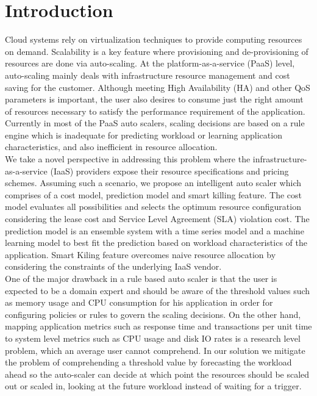 \section{Introduction}
Cloud systems rely on virtualization techniques to provide computing resources on demand. Scalability is a key feature where provisioning and de-provisioning of resources are done via auto-scaling. At the platform-as-a-service (PaaS) level, auto-scaling mainly deals with infrastructure resource management and cost saving for the customer. Although meeting High Availability (HA) and other QoS parameters is important, the user also desires to consume just the right amount of resources necessary to satisfy the performance requirement of the application. Currently in most of the PaaS auto scalers, scaling decisions are based on a rule engine which is inadequate for predicting workload or learning application characteristics, and also inefficient in resource allocation. \\

We take a novel perspective in addressing this problem where the infrastructure-as-a-service (IaaS) providers expose their resource specifications and pricing schemes. Assuming such a scenario, we propose an intelligent auto scaler which comprises of a cost model, prediction model and smart killing feature. The cost model evaluates all possibilities and selects the optimum resource configuration considering the lease cost and Service Level Agreement (SLA) violation cost. The prediction model is an ensemble system with a time series model and a machine learning model to best fit the prediction based on workload characteristics of the application. Smart Kiling feature overcomes naive resource allocation by considering the constraints of the underlying IaaS vendor. \\

One of the major drawback in a rule based auto scaler is that the user is expected to be a domain expert and should be aware of the threshold values such as memory usage and CPU consumption for his application in order for configuring policies or rules to govern the scaling decisions.\cite{modeldriven} On the other hand, mapping application metrics such as response time and transactions per unit time to system level metrics such as CPU usage and disk IO rates is a research level problem, which an average user cannot comprehend. In our solution we mitigate the problem of comprehending a threshold value by forecasting the workload ahead so the auto-scaler can decide at which point the resources should be scaled out or scaled in, looking at the future workload instead of waiting for a trigger.\\

